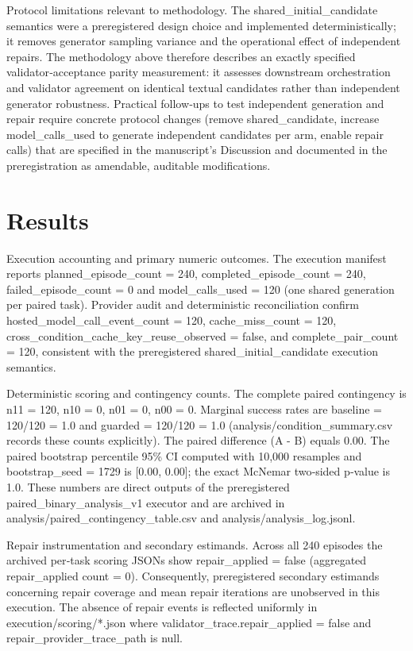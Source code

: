\documentclass[conference]{IEEEtran}
\begin{document}
Protocol limitations relevant to methodology. The shared\_initial\_candidate semantics were a preregistered design choice and implemented deterministically; it removes generator sampling variance and the operational effect of independent repairs. The methodology above therefore describes an exactly specified validator‑acceptance parity measurement: it assesses downstream orchestration and validator agreement on identical textual candidates rather than independent generator robustness. Practical follow‑ups to test independent generation and repair require concrete protocol changes (remove shared\_candidate, increase model\_calls\_used to generate independent candidates per arm, enable repair calls) that are specified in the manuscript's Discussion and documented in the preregistration as amendable, auditable modifications.

\section{Results}
Execution accounting and primary numeric outcomes. The execution manifest reports planned\_episode\_count = 240, completed\_episode\_count = 240, failed\_episode\_count = 0 and model\_calls\_used = 120 (one shared generation per paired task). Provider audit and deterministic reconciliation confirm hosted\_model\_call\_event\_count = 120, cache\_miss\_count = 120, cross\_condition\_cache\_key\_reuse\_observed = false, and complete\_pair\_count = 120, consistent with the preregistered shared\_initial\_candidate execution semantics.

Deterministic scoring and contingency counts. The complete paired contingency is n11 = 120, n10 = 0, n01 = 0, n00 = 0. Marginal success rates are baseline = 120/120 = 1.0 and guarded = 120/120 = 1.0 (analysis/condition\_summary.csv records these counts explicitly). The paired difference (A - B) equals 0.00. The paired bootstrap percentile 95\% CI computed with 10,000 resamples and bootstrap\_seed = 1729 is [0.00, 0.00]; the exact McNemar two‑sided p‑value is 1.0. These numbers are direct outputs of the preregistered paired\_binary\_analysis\_v1 executor and are archived in analysis/paired\_contingency\_table.csv and analysis/analysis\_log.jsonl.

Repair instrumentation and secondary estimands. Across all 240 episodes the archived per‑task scoring JSONs show repair\_applied = false (aggregated repair\_applied count = 0). Consequently, preregistered secondary estimands concerning repair coverage and mean repair iterations are unobserved in this execution. The absence of repair events is reflected uniformly in execution/scoring/*.json where validator\_trace.repair\_applied = false and repair\_provider\_trace\_path is null.
\end{document}

